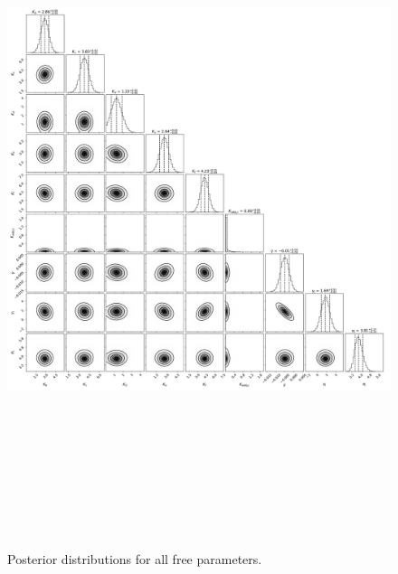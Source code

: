 \documentclass{emulateapj}
\begin{document}
 
\begin{figure}[!h]
\centering

\includegraphics[height=8.0in,width=6.0in,keepaspectratio]{TOI-1246_add_bc_corner.pdf}
\caption{Posterior distributions for all free parameters.}
\end{figure} 

 
\end{document}
